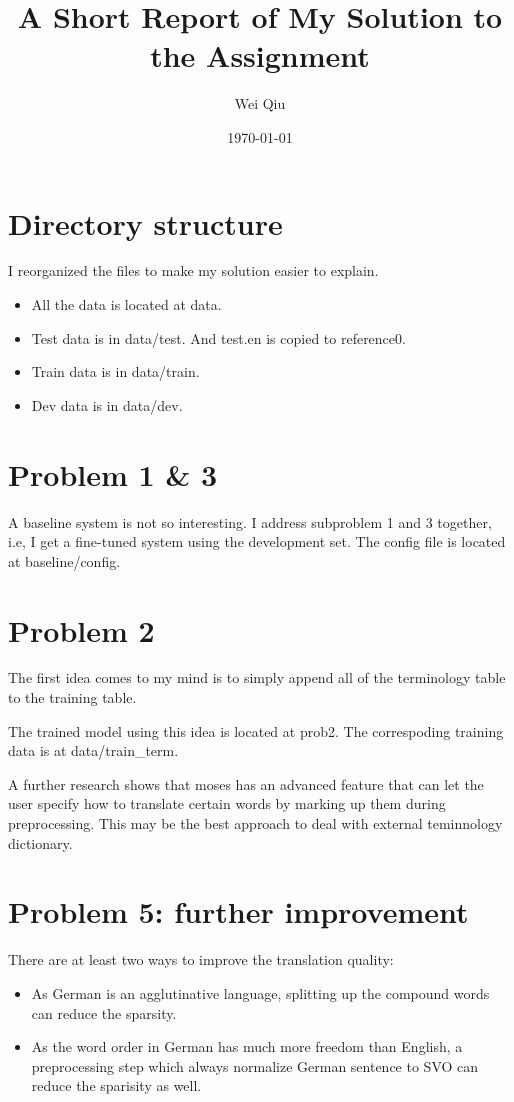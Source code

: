 \documentclass[a4paper]{article}
\title{A Short Report of My Solution to the Assignment}
\author{Wei Qiu}
\date{\today}
\begin{document}
\maketitle

\section{Directory structure}
I reorganized the files to make my solution easier to explain.
\begin{itemize}
    \item All the data is located at data.
    \item Test data is in data/test. And test.en is copied to reference0.
    \item Train data is in data/train. 
    \item Dev data is in data/dev.
\end{itemize}

\section{Problem 1 \& 3}

A baseline system is not so interesting.
I address subproblem 1 and 3 together, i.e, I get a fine-tuned system using the development set. 
The config file is located at baseline/config.

\section{Problem 2}
The first idea comes to my mind is to simply append all of the terminology table to the training table.

The trained model using this idea is located at prob2. The correspoding training data is at data/train\_term.

A further research shows that moses has an advanced feature that can let the user specify how to translate certain words by marking up them during preprocessing.
This may be the best approach to deal with external teminnology dictionary.




\section{Problem 5: further improvement}
There are at least two ways to improve the translation quality:
\begin{itemize}
    \item As German is an agglutinative language, splitting up the compound words can reduce the sparsity. 
    \item As the word order in German has much more freedom than English, a preprocessing step which always normalize German sentence to SVO can reduce the sparisity as well.

\end{itemize}
\end{document}
